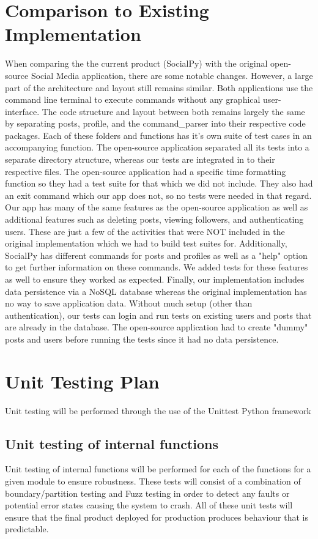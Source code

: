 \documentclass[12pt, titlepage]{article}
\begin{document}
\section{Comparison to Existing Implementation}	
When comparing the the current product (SocialPy) with the original open-source Social Media application, there are some notable changes. However, a large part of the architecture and layout still remains similar. Both applications use the command line terminal to execute commands without any graphical user-interface. The code structure and layout between both remains largely the same by separating posts, profile, and the command\_parser into their respective code packages. Each of these folders and functions has it's own suite of test cases in an accompanying function. The open-source application separated all its tests into a separate directory structure, whereas our tests are integrated in to their respective files. The open-source application had a specific time formatting function so they had a test suite for that which we did not include. They also had an exit command which our app does not, so no tests were needed in that regard. Our app has many of the same features as the open-source application as well as additional features such as deleting posts, viewing followers, and authenticating users. These are just a few of the activities that were NOT included in the original implementation which we had to build test suites for. Additionally, SocialPy has different commands for posts and profiles as well as a "help" option to get further information on these commands. We added tests for these features as well to ensure they worked as expected. Finally, our implementation includes data persistence via a NoSQL database whereas the original implementation has no way to save application data. Without much setup (other than authentication), our tests can login and run tests on existing users and posts that are already in the database.  The open-source application had to create "dummy" posts and users before running the tests since it had no data persistence.
				
\section{Unit Testing Plan}
Unit testing will be performed through the use of the Unittest Python framework
		
\subsection{Unit testing of internal functions}
Unit testing of internal functions will be performed for each of the functions for a given module to ensure robustness. These tests will consist of a combination of boundary/partition testing and Fuzz testing in order to detect any faults or potential error states causing the system to crash. All of these unit tests will ensure that the final product deployed for production produces behaviour that is predictable.
\end{document}
